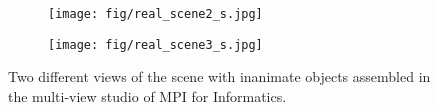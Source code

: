 \begin{figure}[t]
\centering
\begin{subfigure}{.5\linewidth}
\centering
\texttt{[image: fig/real\_scene2\_s.jpg]}
\caption{} %
\label{fig:real_data_objects1}
\end{subfigure}%
\begin{subfigure}{.5\linewidth}
\centering
\texttt{[image: fig/real\_scene3\_s.jpg]}
\caption{} %
\label{fig:real_data_objects2}
\end{subfigure}
\caption{Two different views of the scene with inanimate objects assembled in the multi-view studio of MPI for Informatics. 
}
\label{fig:real_data_objects}
\end{figure}
